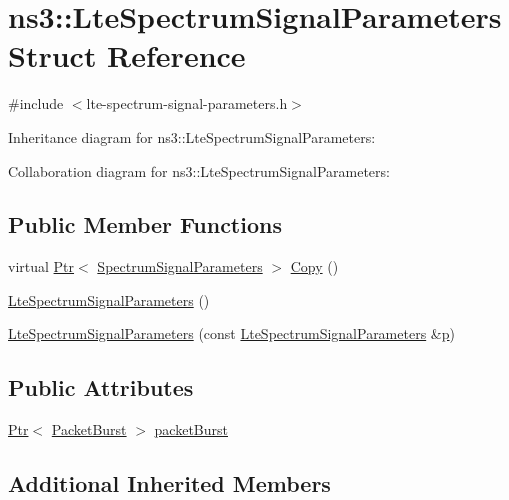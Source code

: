 \hypertarget{structns3_1_1LteSpectrumSignalParameters}{}\section{ns3\+:\+:Lte\+Spectrum\+Signal\+Parameters Struct Reference}
\label{structns3_1_1LteSpectrumSignalParameters}


{\ttfamily \#include $<$lte-\/spectrum-\/signal-\/parameters.\+h$>$}



Inheritance diagram for ns3\+:\+:Lte\+Spectrum\+Signal\+Parameters\+:


Collaboration diagram for ns3\+:\+:Lte\+Spectrum\+Signal\+Parameters\+:
\subsection*{Public Member Functions}
\begin{DoxyCompactItemize}
\item 
virtual \hyperlink{classns3_1_1Ptr}{Ptr}$<$ \hyperlink{structns3_1_1SpectrumSignalParameters}{Spectrum\+Signal\+Parameters} $>$ \hyperlink{structns3_1_1LteSpectrumSignalParameters_a0a51e05909f40de703a020d73381b472}{Copy} ()
\item 
\hyperlink{structns3_1_1LteSpectrumSignalParameters_a5638fc3b985cb1d27a4953903c515c9c}{Lte\+Spectrum\+Signal\+Parameters} ()
\item 
\hyperlink{structns3_1_1LteSpectrumSignalParameters_add6963190f5aa39a45676f9aece1c3ef}{Lte\+Spectrum\+Signal\+Parameters} (const \hyperlink{structns3_1_1LteSpectrumSignalParameters}{Lte\+Spectrum\+Signal\+Parameters} \&\hyperlink{lte__link__budget__x2__handover__measures_8m_ac9de518908a968428863f829398a4e62}{p})
\end{DoxyCompactItemize}
\subsection*{Public Attributes}
\begin{DoxyCompactItemize}
\item 
\hyperlink{classns3_1_1Ptr}{Ptr}$<$ \hyperlink{classns3_1_1PacketBurst}{Packet\+Burst} $>$ \hyperlink{structns3_1_1LteSpectrumSignalParameters_a3c1712875f6139230ba68912ace57ae8}{packet\+Burst}
\end{DoxyCompactItemize}
\subsection*{Additional Inherited Members}


